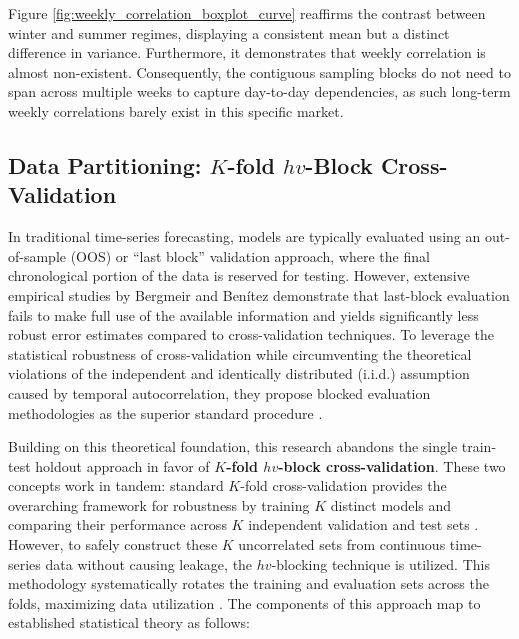 Figure \ref{fig:weekly_correlation_boxplot_curve} reaffirms the contrast between winter and summer regimes, displaying a consistent mean but a distinct difference in variance. Furthermore, it demonstrates that weekly correlation is almost non-existent. Consequently, the contiguous sampling blocks do not need to span across multiple weeks to capture day-to-day dependencies, as such long-term weekly correlations barely exist in this specific market.

\subsection{Data Partitioning: $K$-fold $hv$-Block Cross-Validation}
In traditional time-series forecasting, models are typically evaluated using an out-of-sample (OOS) or ``last block'' validation approach, where the final chronological portion of the data is reserved for testing. However, extensive empirical studies by Bergmeir and Benítez \cite{BERGMEIR2012192} demonstrate that last-block evaluation fails to make full use of the available information and yields significantly less robust error estimates compared to cross-validation techniques. To leverage the statistical robustness of cross-validation while circumventing the theoretical violations of the independent and identically distributed (i.i.d.) assumption caused by temporal autocorrelation, they propose blocked evaluation methodologies as the superior standard procedure \cite{BERGMEIR201870}.

Building on this theoretical foundation, this research abandons the single train-test holdout approach in favor of \textbf{$K$-fold $hv$-block cross-validation}. These two concepts work in tandem: standard $K$-fold cross-validation provides the overarching framework for robustness by training $K$ distinct models and comparing their performance across $K$ independent validation and test sets \cite{BROWNE2000108}. However, to safely construct these $K$ uncorrelated sets from continuous time-series data without causing leakage, the $hv$-blocking technique is utilized. This methodology systematically rotates the training and evaluation sets across the folds, maximizing data utilization \cite{RACINE200039}. The components of this approach map to established statistical theory as follows:

